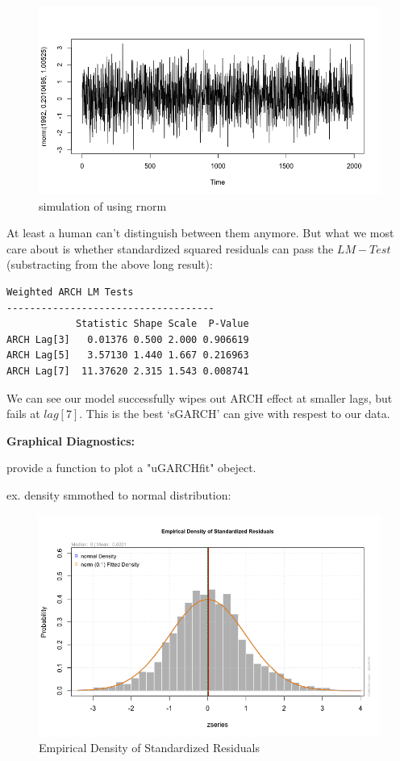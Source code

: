 \documentclass[a4paper, 11pt]{article}
\begin{document}
\begin{figure}[H]
\centering
\caption{simulation of using rnorm}
\includegraphics[scale=.40]{rnorm.png}
\end{figure}

\indent At least a human can't distinguish between them anymore. But what we most care about is whether standardized squared residuals can pass the $LM-Test$(substracting from the above long result):

\begin{verbatim}
Weighted ARCH LM Tests
------------------------------------
            Statistic Shape Scale  P-Value
ARCH Lag[3]   0.01376 0.500 2.000 0.906619
ARCH Lag[5]   3.57130 1.440 1.667 0.216963
ARCH Lag[7]  11.37620 2.315 1.543 0.008741
\end{verbatim}

We can see our model successfully wipes out ARCH effect at smaller lags, but fails at $lag[7]$. This is the best `sGARCH' can give with respest to our data.


\textbf{Graphical Diagnostics:}\par
{} provide a function to plot a "uGARCHfit" obeject.\par
ex. density smmothed to normal distribution:
\begin{figure}[H]
\centering
\caption{Empirical Density of Standardized Residuals}
\includegraphics[scale=.60]{density.png}
\end{figure}
 
\end{document}

